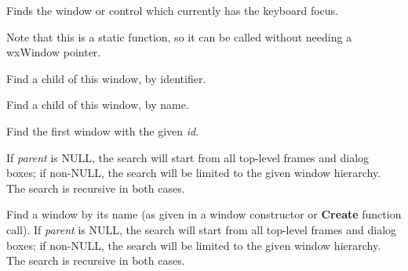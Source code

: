 Finds the window or control which currently has the keyboard focus.


Note that this is a static function, so it can be called without needing a wxWindow pointer.



\label{wxwindowfindwindow}


Find a child of this window, by identifier.


Find a child of this window, by name.


\label{wxwindowfindwindowbyid}


Find the first window with the given {\it id}.

If {\it parent} is NULL, the search will start from all top-level
frames and dialog boxes; if non-NULL, the search will be limited to the given window hierarchy.
The search is recursive in both cases.



\label{wxwindowfindwindowbyname}


Find a window by its name (as given in a window constructor or {\bf Create} function call).
If {\it parent} is NULL, the search will start from all top-level
frames and dialog boxes; if non-NULL, the search will be limited to the given window hierarchy.
The search is recursive in both cases.

